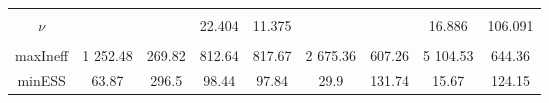\begin{footnotesize}
\begin{singlespace}
\begin{tabular}{ccccccccc}
 & \begin{tiny} [-0.032,0.164] \end{tiny}  & \begin{tiny} [-0.006,0.126] \end{tiny}  & \begin{tiny} [-0.031,0.166] \end{tiny}  & \begin{tiny} [-0.039,0.136] \end{tiny}  & \begin{tiny} [-0.545,-0.367] \end{tiny}  & \begin{tiny} [-0.475,-0.348] \end{tiny}  & \begin{tiny} [-0.541,-0.362] \end{tiny}  & \begin{tiny} [-0.462,-0.334] \end{tiny}  \\ 
$\nu$ &  &  & 22.404 & 11.375 &  &  & 16.886 &  106.091 \\ 
 &  &  & \begin{tiny} [16.6,27.8] \end{tiny}  & \begin{tiny} [9.2,13.7] \end{tiny}  &  &  & \begin{tiny} [12.4,22.4] \end{tiny}  & \begin{tiny} [73.9, 128] \end{tiny}  \\  \midrule 
maxIneff & 1 252.48 &  269.82 &  812.64 &  817.67 & 2 675.36 &  607.26 & 5 104.53 &  644.36 \\ 
minESS & 63.87 &  296.5 & 98.44 & 97.84 & 29.9 &  131.74 & 15.67 &  124.15 \\ \bottomrule 
\end{tabular}
\end{singlespace}
\end{footnotesize}